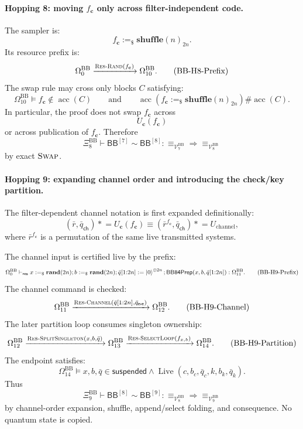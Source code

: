 \documentclass{report}
\theoremstyle{defn_style}
\newcommand{\asteq}{\mathrel{*}=}
\providecommand{\Live}{\operatorname{Live}}
\providecommand{\acc}{\operatorname{acc}}
\providecommand{\HopBB}[1]{\mathsf{BB}^{[#1]}}
\begin{document}
\paragraph{Hopping 8: moving \(f_{\mathbf c}\) only across filter-independent code.}
The sampler is:
\[
f_{\mathbf c}:=_\$\mathbf{shuffle}(n)_{2n}.
\]
Its resource prefix is:
\[
\Omega^{\mathrm{BB}}_0
\xrightarrow{\textsc{Res-Rand}(f_{\mathbf c})}
\Omega^{\mathrm{BB}}_{10}.
\tag{BB-H8-Prefix}\label{BB-H8-Prefix}
\]
The swap rule may cross only blocks \(C\) satisfying:
\[
\Omega^{\mathrm{BB}}_{10}
\models
f_{\mathbf c}\notin\acc(C)
\qquad
\text{and}
\qquad
\acc(f_{\mathbf c}:=_\$\mathbf{shuffle}(n)_{2n})\#\acc(C).
\tag{BB-H8-SwapReq}
\]
In particular, the proof does not swap \(f_{\mathbf c}\) across
\[
U_{\mathbf c}(f_{\mathbf c})
\]
or across publication of \(f_{\mathbf c}\).  Therefore
\[
\Xi^{\mathrm{BB}}_8
\vdash
\HopBB{7}\sim\HopBB{8}:
\equiv_{\mathcal V^{\mathrm{BB}}_7}
\Longrightarrow
\equiv_{\mathcal V^{\mathrm{BB}}_8}
\tag{BB-H8-Rel}\label{BB-H8-Rel}
\]
by exact \(\textsc{Swap}\).

\paragraph{Hopping 9: expanding channel order and introducing the check/key partition.}
The filter-dependent channel notation is first expanded definitionally:
\[
(\bar r,\bar q_{\mathsf{ch}})\asteq U_{\mathbf c}(f_{\mathbf c})
\equiv
(\bar r^{f_{\mathbf c}},\bar q_{\mathsf{ch}})
\asteq U_{\mathrm{channel}},
\]
where \(\bar r^{f_{\mathbf c}}\) is a permutation of the same live transmitted
systems.

The channel input is certified live by the prefix:
\[
\Omega^{\mathrm{BB}}_0
\vdash_{\mathsf{res}}
x:=_\$\mathbf{rand}(2n);
b:=_\$\mathbf{rand}(2n);
\bar q[1{:}2n]:=\ket0^{\otimes 2n};
\mathsf{BB84Prep}(x,b,\bar q[1{:}2n])
:
\Omega^{\mathrm{BB}}_{11}.
\tag{BB-H9-Prefix}\label{BB-H9-Prefix}
\]
The channel command is checked:
\[
\Omega^{\mathrm{BB}}_{11}
\xrightarrow{\textsc{Res-Channel}(\bar q[1{:}2n],\bar q_{\mathsf{eve}})}
\Omega^{\mathrm{BB}}_{12}.
\tag{BB-H9-Channel}
\]
The later partition loop consumes singleton ownership:
\[
\Omega^{\mathrm{BB}}_{12}
\xrightarrow{\textsc{Res-SplitSingleton}(x,b,\bar q)}
\Omega^{\mathrm{BB}}_{13}
\xrightarrow{\textsc{Res-SelectLoop}(f_{x,b})}
\Omega^{\mathrm{BB}}_{14}.
\tag{BB-H9-Partition}
\]
The endpoint satisfies:
\[
\Omega^{\mathrm{BB}}_{14}
\models
x,b,\bar q\in\mathsf{suspended}
\land
\Live(c,b_c,\bar q_c,k,b_k,\bar q_k).
\tag{BB-H9-PartitionReq}
\]
Thus
\[
\Xi^{\mathrm{BB}}_9
\vdash
\HopBB{8}\sim\HopBB{9}:
\equiv_{\mathcal V^{\mathrm{BB}}_8}
\Longrightarrow
\equiv_{\mathcal V^{\mathrm{BB}}_9}
\tag{BB-H9-Rel}\label{BB-H9-Rel}
\]
by channel-order expansion, shuffle, append/select folding, and consequence.
No quantum state is copied.
\end{document}
